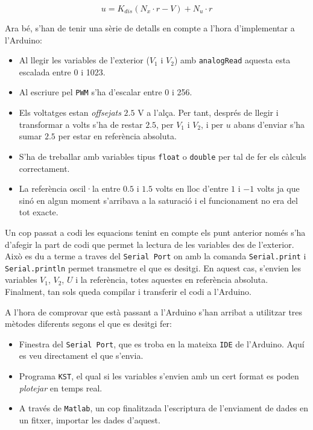 \documentclass[12pt,a4paper,final,twoside,openright]{report}
\begin{document}
\begin{equation}\label{eq:dis_u}
u=K_{dis} (N_x \cdot r - V) + N_u \cdot r
\end{equation}

Ara bé, s'han de tenir una sèrie de detalls en compte a l'hora d'implementar a l'Arduino:

\begin{itemize}
\item Al llegir les variables de l'exterior ($V_1$ i $V_2$) amb \texttt{analogRead} aquesta esta escalada entre 0 i 1023.
\item Al escriure pel \texttt{PWM} s'ha d'escalar entre 0 i 256.
\item Els voltatges estan \textit{offsejats} $2.5$ V a l'alça. Per tant, després de llegir i transformar a volts s'ha de restar $2.5$, per $V_1$ i $V_2$, i per $u$ abans d'enviar s'ha sumar $2.5$ per estar en referència absoluta.
\item S'ha de treballar amb variables tipus \texttt{float} o \texttt{double} per tal de fer els càlculs correctament.
\item La referència oscil·la entre $0.5$ i $1.5$ volts en lloc d'entre $1$ i $-1$ volts ja que sinó en algun moment s'arribava a la saturació i el funcionament no era del tot exacte.
\end{itemize}

Un cop passat a codi les equacions tenint en compte els punt anterior només s'ha d'afegir la part de codi que permet la lectura de les variables des de l'exterior. Això es du a terme a traves del \texttt{Serial Port} on amb la comanda \texttt{Serial.print} i \texttt{Serial.println} permet transmetre el que es desitgi. En aquest cas, s'envien les variables $V_1$, $V_2$, $U$ i la referència, totes aquestes en referència absoluta. Finalment, tan sols queda compilar i transferir el codi a l'Arduino.

A l'hora de comprovar que està passant a l'Arduino s'han arribat a utilitzar tres mètodes diferents segons el que es desitgi fer:

\begin{itemize}
\item Finestra del \texttt{Serial Port}, que es troba en la mateixa \texttt{IDE} de l'Arduino. Aquí es veu directament el que s'envia.
\item Programa \texttt{KST}, el qual si les variables s'envien amb un cert format es poden \textit{plotejar} en temps real.
\item A través de \texttt{Matlab}, un cop finalitzada l'escriptura de l'enviament de dades en un fitxer, importar les dades d'aquest.
\end{itemize}
\end{document}
